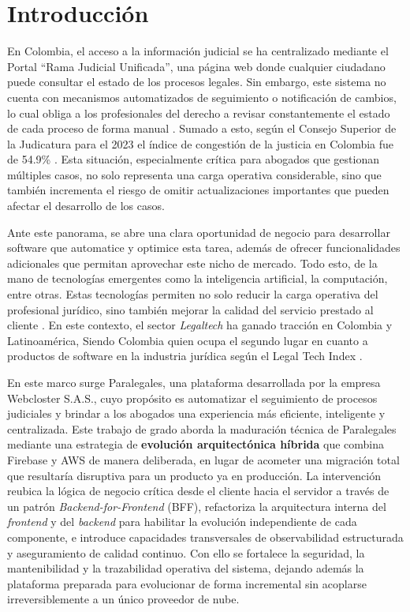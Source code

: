\section{Introducción}

En Colombia, el acceso a la información judicial se ha centralizado mediante el Portal  “Rama Judicial Unificada”, una página web donde cualquier ciudadano puede consultar el estado de los procesos legales. Sin embargo, este sistema no cuenta con mecanismos automatizados de seguimiento o notificación de cambios, lo cual obliga a los profesionales del derecho a revisar constantemente el estado de cada proceso de forma manual \cite{Paez2024}. Sumado a esto,  según el Consejo Superior de la Judicatura para el 2023 el índice de congestión de la justicia en Colombia fue de 54.9\% \cite{Rozo2024}. Esta situación, especialmente crítica para abogados que gestionan múltiples casos, no solo representa una carga operativa considerable, sino que también incrementa el riesgo de omitir actualizaciones importantes que pueden afectar el desarrollo de los casos.

Ante este panorama, se abre una clara oportunidad de negocio para desarrollar software que automatice y optimice esta tarea, además de ofrecer funcionalidades adicionales que permitan aprovechar este nicho de mercado. Todo esto, de la mano de tecnologías emergentes como la inteligencia artificial, la computación, entre otras. Estas tecnologías permiten no solo reducir la carga operativa del profesional jurídico, sino también mejorar la calidad del servicio prestado al cliente \cite{Botero2023}. En este contexto, el sector \textit{Legaltech} ha ganado tracción en Colombia y Latinoamérica, Siendo Colombia quien ocupa el segundo lugar en cuanto a productos de software en la industria jurídica según el Legal Tech Index \cite{Sierra2023}.

En este marco surge Paralegales, una plataforma desarrollada por la empresa Webcloster S.A.S., cuyo propósito es automatizar el seguimiento de procesos judiciales y brindar a los abogados una experiencia más eficiente, inteligente y centralizada. Este trabajo de grado aborda la maduración técnica de Paralegales mediante una estrategia de \textbf{evolución arquitectónica híbrida} que combina Firebase y AWS de manera deliberada, en lugar de acometer una migración total que resultaría disruptiva para un producto ya en producción. La intervención reubica la lógica de negocio crítica desde el cliente hacia el servidor a través de un patrón \textit{Backend-for-Frontend} (BFF), refactoriza la arquitectura interna del \textit{frontend} y del \textit{backend} para habilitar la evolución independiente de cada componente, e introduce capacidades transversales de observabilidad estructurada y aseguramiento de calidad continuo. Con ello se fortalece la seguridad, la mantenibilidad y la trazabilidad operativa del sistema, dejando además la plataforma preparada para evolucionar de forma incremental sin acoplarse irreversiblemente a un único proveedor de nube.
